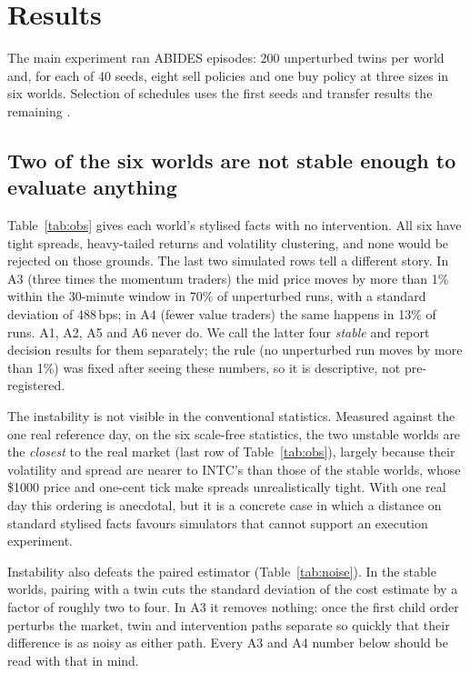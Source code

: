 \section{Results}
\label{sec:results}

The main experiment ran \nEpisodes{} ABIDES episodes: 200 unperturbed twins per world and, for each of 40 seeds, eight sell policies and one buy policy at three sizes in six worlds. \runawayText{} Selection of schedules uses the first \nTrain{} seeds and transfer results the remaining \nTest{}.

\subsection{Two of the six worlds are not stable enough to evaluate anything}
\label{sec:stability}

Table~\ref{tab:obs} gives each world's stylised facts with no intervention. All six have tight spreads, heavy-tailed returns and volatility clustering, and none would be rejected on those grounds. The last two simulated rows tell a different story. In A3 (three times the momentum traders) the mid price moves by more than 1\% within the 30-minute window in 70\% of unperturbed runs, with a standard deviation of 488\,bps; in A4 (fewer value traders) the same happens in 13\% of runs. A1, A2, A5 and A6 never do. We call the latter four \emph{stable} and report decision results for them separately; the rule (no unperturbed run moves by more than 1\%) was fixed after seeing these numbers, so it is descriptive, not pre-registered.



The instability is not visible in the conventional statistics. Measured against the one real reference day, on the six scale-free statistics, the two unstable worlds are the \emph{closest} to the real market (last row of Table~\ref{tab:obs}), largely because their volatility and spread are nearer to INTC's than those of the stable worlds, whose \$1000 price and one-cent tick make spreads unrealistically tight. With one real day this ordering is anecdotal, but it is a concrete case in which a distance on standard stylised facts favours simulators that cannot support an execution experiment.

Instability also defeats the paired estimator (Table~\ref{tab:noise}). In the stable worlds, pairing with a twin cuts the standard deviation of the cost estimate by a factor of roughly two to four. In A3 it removes nothing: once the first child order perturbs the market, twin and intervention paths separate so quickly that their difference is as noisy as either path. Every A3 and A4 number below should be read with that in mind.

